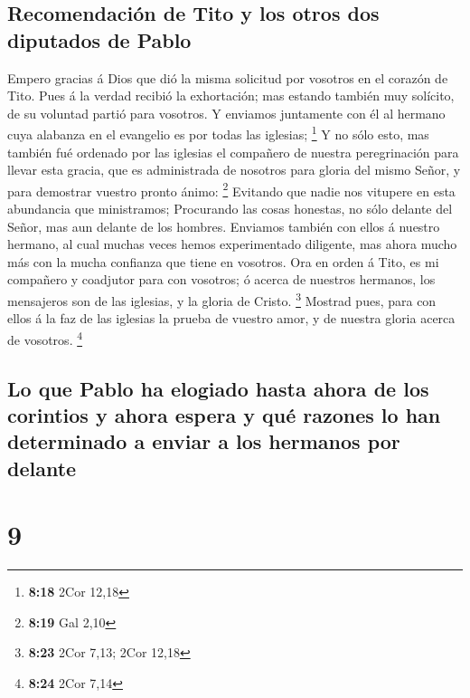 \hypertarget{recomendaciuxf3n-de-tito-y-los-otros-dos-diputados-de-pablo}{%
\subsection{Recomendación de Tito y los otros dos diputados de
Pablo}\label{recomendaciuxf3n-de-tito-y-los-otros-dos-diputados-de-pablo}}

 Empero gracias á Dios que dió la misma solicitud por
vosotros en el corazón de Tito.  Pues á la verdad recibió
la exhortación; mas estando también muy solícito, de su voluntad partió
para vosotros.  Y enviamos juntamente con él al hermano
cuya alabanza en el evangelio es por todas las iglesias; \footnote{\textbf{8:18}
  2Cor 12,18}  Y no sólo esto, mas también fué ordenado por
las iglesias el compañero de nuestra peregrinación para llevar esta
gracia, que es administrada de nosotros para gloria del mismo Señor, y
para demostrar vuestro pronto ánimo: \footnote{\textbf{8:19} Gal 2,10}
 Evitando que nadie nos vitupere en esta abundancia que
ministramos;  Procurando las cosas honestas, no sólo
delante del Señor, mas aun delante de los hombres. 
Enviamos también con ellos á nuestro hermano, al cual muchas veces hemos
experimentado diligente, mas ahora mucho más con la mucha confianza que
tiene en vosotros.  Ora en orden á Tito, es mi compañero y
coadjutor para con vosotros; ó acerca de nuestros hermanos, los
mensajeros son de las iglesias, y la gloria de Cristo. \footnote{\textbf{8:23}
  2Cor 7,13; 2Cor 12,18}  Mostrad pues, para con ellos á la
faz de las iglesias la prueba de vuestro amor, y de nuestra gloria
acerca de vosotros. \footnote{\textbf{8:24} 2Cor 7,14}

\hypertarget{lo-que-pablo-ha-elogiado-hasta-ahora-de-los-corintios-y-ahora-espera-y-quuxe9-razones-lo-han-determinado-a-enviar-a-los-hermanos-por-delante}{%
\subsection{Lo que Pablo ha elogiado hasta ahora de los corintios y
ahora espera y qué razones lo han determinado a enviar a los hermanos
por
delante}\label{lo-que-pablo-ha-elogiado-hasta-ahora-de-los-corintios-y-ahora-espera-y-quuxe9-razones-lo-han-determinado-a-enviar-a-los-hermanos-por-delante}}

\hypertarget{section-8}{%
\section{9}\label{section-8}}

